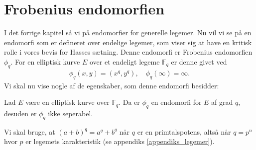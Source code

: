 \section{Frobenius endomorfien}
I det forrige kapitel så vi på endomorfier for generelle legemer. Nu vil vi se på en endomorfi som er defineret over endelige legemer, som viser sig at have en kritisk rolle i vores bevis for Hasses sætning. Denne endomorfi er Frobenius endomorfien $\phi_q$. For en elliptisk kurve $E$ over et endeligt legeme $\mathbb{F}_q$ er denne givet ved
\begin{align}
	\phi_q (x, y) = (x^q, y^q), \quad \phi_q(\infty) = \infty.
\end{align}
Vi skal nu vise nogle af de egenskaber, som denne endomorfi besidder:
\begin{lemma}
\label{lemma_end_degree_not_sep}
Lad $E$ være en elliptisk kurve over $\mathbb{F}_q$. Da er $\phi_q$ en 
endomorfi for $E$ af grad $q$, desuden er $\phi_q$ ikke seperabel.
\end{lemma}
Vi skal bruge, at $(a + b)^q = a^q + b^q$ når $q$ er en primtalspotens, altså når $q=p^n$ hvor $p$ er legemets karakteristik (se appendiks \ref{appendiks_legemer}).
